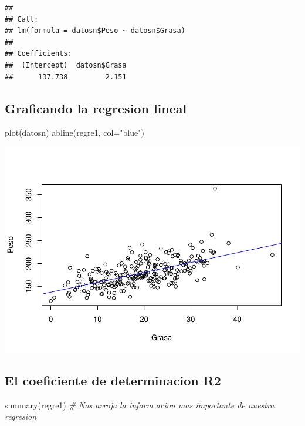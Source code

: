 \documentclass[
]{article}
\newenvironment{Shaded}{\begin{snugshade}}{\end{snugshade}}
\newcommand{\AttributeTok}[1]{\textcolor[rgb]{0.77,0.63,0.00}{#1}}
\newcommand{\CommentTok}[1]{\textcolor[rgb]{0.56,0.35,0.01}{\textit{#1}}}
\newcommand{\FunctionTok}[1]{\textcolor[rgb]{0.00,0.00,0.00}{#1}}
\newcommand{\NormalTok}[1]{#1}
\newcommand{\StringTok}[1]{\textcolor[rgb]{0.31,0.60,0.02}{#1}}
\begin{document}
\begin{verbatim}
## 
## Call:
## lm(formula = datosn$Peso ~ datosn$Grasa)
## 
## Coefficients:
##  (Intercept)  datosn$Grasa  
##      137.738         2.151
\end{verbatim}

\hypertarget{graficando-la-regresion-lineal}{%
\subsection{Graficando la regresion
lineal}\label{graficando-la-regresion-lineal}}

\begin{Shaded}
\begin{Highlighting}[]
\FunctionTok{plot}\NormalTok{(datosn)}
\FunctionTok{abline}\NormalTok{(regre1, }\AttributeTok{col=}\StringTok{"blue"}\NormalTok{)}
\end{Highlighting}
\end{Shaded}

\includegraphics{Teoria4_files/figure-latex/Grafico-1.pdf}

\hypertarget{el-coeficiente-de-determinacion-r2}{%
\subsection{El coeficiente de determinacion
R2}\label{el-coeficiente-de-determinacion-r2}}

\begin{Shaded}
\begin{Highlighting}[]
\FunctionTok{summary}\NormalTok{(regre1) }\CommentTok{\# Nos arroja la inform acion mas importante de nuestra regresion}
\end{Highlighting}
\end{Shaded}
\end{document}
